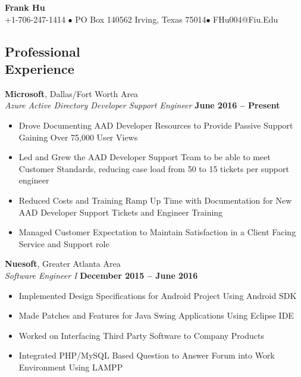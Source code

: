 \documentclass[margin,line]{resume}
\begin{document}
	{\centering \LARGE{\textbf{Frank Hu}}}
	\\
	\normalsize
	+1-706-247-1414 $\bullet$ PO Box 140562 Irving, Texas 75014$\bullet$ FHu004@Fiu.Edu
	
	\begin{resume}
	
		
	\section{\mysidestyle Professional\\Experience}
	
	\textbf{Microsoft}, Dallas/Fort Worth Area \vspace{1mm}\\\vspace{1mm}
	\textsl{Azure Active Directory Developer Support Engineer} \hfill \textbf{June 2016 -- Present}
	\begin{itemize}
		 \item Drove Documenting AAD Developer Resources to Provide Passive Support Gaining Over 75,000 User Views	
		 \item Led and Grew the AAD Developer Support Team to be able to meet Customer Standards, reducing case load from 50 to 15 tickets per support engineer 
		 \item Reduced Costs and Training Ramp Up Time with Documentation for New AAD Developer Support Tickets and Engineer Training 
		\item Managed Customer Expectation to Maintain Satisfaction in a Client
		Facing Service and Support role
	
	\end{itemize}

	\textbf{Nuesoft}, Greater Atlanta Area \vspace{1mm}\\\vspace{1mm}%
	\textsl{Software Engineer I} \hfill \textbf{December 2015 -- June 2016}
	\begin{itemize}
	 	\item Implemented Design Specifications for Android Project Using Android SDK
	 	\item Made Patches and Features for Java Swing Applications Using Eclipse IDE 
	 	\item Worked on Interfacing Third Party Software to Company Products
	 	\item Integrated PHP/MySQL Based Question to Answer Forum into Work Environment Using LAMPP
	\end{itemize}
	

\end{resume}
\end{document}
